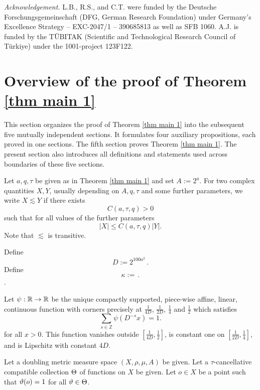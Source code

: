 \noindent \textit{Acknowledgement.}
L.B., R.S., and C.T. were funded by the Deutsche Forschungsgemeinschaft (DFG, German Research Foundation) under Germany's Excellence Strategy -- EXC-2047/1 -- 390685813 as well as SFB 1060.
A.J. is funded by the T\"UBITAK (Scientific and Technological Research Council of T\"urkiye) under the 1001-project 123F122.

\chapter{Overview of the proof of Theorem \ref{thm main 1}}
\label{overviewsection}


This section organizes the proof of Theorem
\ref{thm main 1} into the subsequent five
mutually independent sections.
It formulates four auxiliary propositions, each proved
 in one sections. The fifth section proves Theorem \ref{thm main 1}.
The present section  also introduces all definitions and statements used across boundaries of these five sections.


Let $a, q, \tau$ be given as in Theorem \ref{thm main 1}
and set $A:=2^a$.
For two complex quantities $X,Y$, usually depending on
$A, q, \tau$ and some further parameters,
we write $X\lesssim Y$ if there exists
 \[C(a,\tau,q)>0\]
such that for all values of the further parameters
\[|X|\le C(a,\tau,q)|Y|.\] Note that $\lesssim$ is transitive.



Define
\begin{equation}\label{defineD}
D:= 2^{100 a^2}\,  .
\end{equation}
Define
\begin{equation}\label{definekappa}
\kappa:= \,  .
\end{equation}
.

Let
 $\psi:\mathbb{R} \to \mathbb{R}$ be the unique compactly supported, piece-wise affine, linear, continuous function with corners precisely at $\frac 1{4D}$, $\frac 1{2D}$, $\frac 14$ and $\frac 12$ which satisfies
 \begin{equation}
    \label{eq psisum}
    \sum_{s\in \mathbb{Z}} \psi(D^{-s}x)=1 .
\end{equation}
for all  $x>0$. This function vanishes outside $[\frac1{4D},\frac 12]$, is constant one on
$[\frac1{2D},\frac 14]$, and is Lipschitz
with constant $4D$.







Let a doubling metric measure space $(X,\rho,\mu, A)$ be given.
Let a $\tau$-cancellative compatible collection $\Theta$ of functions on $X$ be given. 
Let $o\in X$ be a point such that $\vartheta(o)=1$
for all $\vartheta\in \Theta$.

